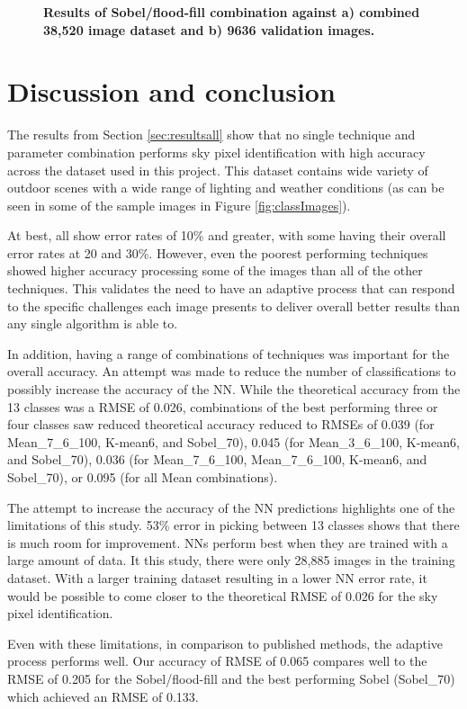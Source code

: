 \documentclass[final,3p,times,authoryear]{elsarticle}
\begin{document}
\begin{figure}
\caption{\textbf{Results of Sobel/flood-fill combination against a) combined 38,520 image dataset and b) 9636 validation images.}}
\label{fig:errorfloodall}
\end{figure}


\section{Discussion and conclusion}\label{sec:conclusion}
The results from Section \ref{sec:resultsall} show that no single technique and parameter combination performs sky pixel identification with high accuracy across the dataset used in this project. This dataset contains wide variety of outdoor scenes with a wide range of lighting and weather conditions (as can be seen in some of the sample images in Figure \ref{fig:classImages}). 

At best, all show error rates of 10\% and greater, with some having their overall error rates at 20 and 30\%. However, even the poorest performing techniques showed higher accuracy processing some of the images than all of the other techniques. This validates the need to have an adaptive process that can respond to the specific challenges each image presents to deliver overall better results than any single algorithm is able to.


In addition, having a range of combinations of techniques was important for the overall accuracy. An attempt was made to reduce the number of classifications to possibly increase the accuracy of the NN. While the theoretical accuracy from the 13 classes was a RMSE of 0.026, combinations of the best performing three or four classes saw reduced theoretical accuracy reduced to RMSEs of 0.039 (for Mean\_7\_6\_100, K-mean6, and Sobel\_70), 0.045 (for Mean\_3\_6\_100, K-mean6, and Sobel\_70), 0.036 (for Mean\_7\_6\_100, Mean\_7\_6\_100, K-mean6, and Sobel\_70), or 0.095 (for all Mean combinations). 

The attempt to increase the accuracy of the NN predictions highlights one of the limitations of this study. 53\% error in picking between 13 classes shows that there is much room for improvement. NNs perform best when they are trained with a large amount of data. It this study, there were only 28,885 images in the training dataset. With a larger training dataset resulting in a lower NN error rate, it would be possible to come closer to the theoretical RMSE of 0.026 for the sky pixel identification.

Even with these limitations, in comparison to published methods, the adaptive process performs well. Our accuracy of RMSE of 0.065 compares well to the RMSE of 0.205 for the Sobel/flood-fill and the best performing Sobel (Sobel\_70) which achieved an RMSE of 0.133.
\end{document}
